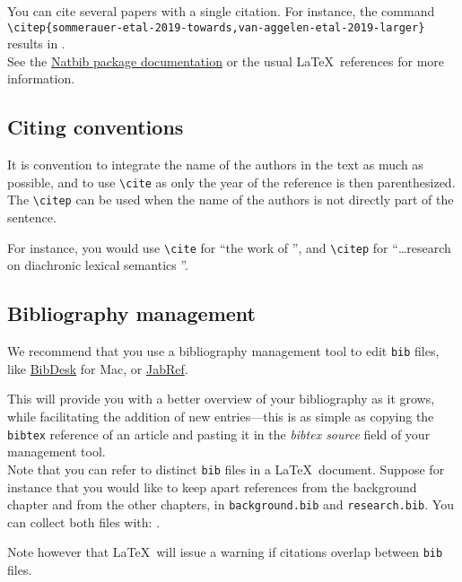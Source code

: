 You can cite several papers with a single citation. For instance, the command
\verb|\citep{sommerauer-etal-2019-towards,van-aggelen-etal-2019-larger}| \hfill results 
in \citep{sommerauer-etal-2019-towards,van-aggelen-etal-2019-larger}.\\

See the \href{http://ctan.cs.uu.nl/macros/latex/contrib/natbib/natbib.pdf}{Natbib package documentation} or the usual \LaTeX\ references for more information. 

\subsection{Citing conventions}
It is convention to integrate the name of the authors in the text as much as possible, and to use \verb|\cite| as only the year of the reference is then parenthesized. The \verb|\citep| can be used when the name of the authors is not directly part of the sentence. 

For instance, you would use \verb|\cite| for ``the work of \cite{van-aggelen-etal-2019-larger}'', and \verb|\citep| for ``\ldots research on diachronic lexical semantics \citep{van-aggelen-etal-2019-larger}''. 

\subsection{Bibliography management}
We recommend that you use a bibliography management tool to edit \texttt{bib} files, like \href{https://bibdesk.sourceforge.io}{BibDesk} for Mac, or \href{https://www.jabref.org}{JabRef}.

This will provide you with a better overview of your bibliography as it grows, while facilitating the addition of new entries---this is as simple as copying the \texttt{bibtex} reference of an article and pasting it in the {\em bibtex source} field of your management tool.\\

Note that you can refer to distinct \texttt{bib} files in a \LaTeX\ document. Suppose for instance that you would like to keep apart references from the background chapter and from the other chapters, in \texttt{background.bib} and \texttt{research.bib}. You can collect both files with:
\verb||.

Note however that \LaTeX\ will issue a warning if citations overlap between \texttt{bib} files.



 
